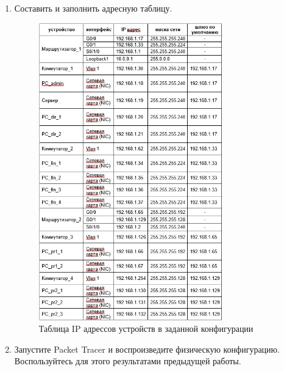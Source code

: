 \documentclass[bachelor, och, labwork]{shiza}
\begin{document}


\begin{enumerate}

    \item Составить и заполнить адресную таблицу.
        
    \begin{figure}[H]
        \centering      %
        \includegraphics[width=0.75\textwidth]{1}
        \caption{Таблица IP адрессов устройств в заданной конфигурации}
        \label{fig:image1}
    \end{figure}

    \item Запустите Packet Tracer и воспроизведите физическую конфигурацию. Воспользуйтесь для этого 
    результатами предыдущей работы.


\end{enumerate}
\end{document}
